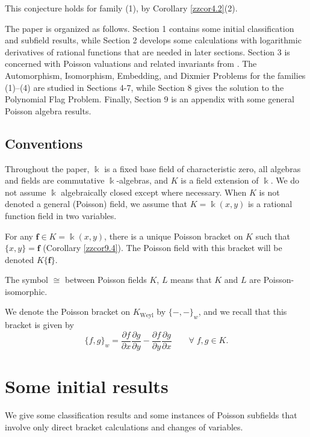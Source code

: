 \documentclass[12pt]{amsart}
\theoremstyle{plain}
\numberwithin{theorem}{section}
\numberwithin{equation}{theorem}
\theoremstyle{definition}
\newcommand \bff {{\mathbf{f}}}
\DeclareMathOperator{\Weyl}{Weyl}
\newcommand \Kweyl {K_{\Weyl}}
\begin{document}
This conjecture holds for family (1), 
by Corollary \ref{zzcor4.2}(2).
\medskip

The paper is organized as follows. 
Section 1 contains some initial 
classification and subfield results, 
while Section 2 develops some calculations 
with logarithmic derivatives of 
rational functions that are needed in 
later sections.  Section 3 is concerned 
with Poisson valuations and related 
invariants from \cite{HTWZ1, HTWZ2}.  
The Automorphism, Isomorphism, Embedding, 
and Dixmier Problems for the families 
(1)--(4) are studied in Sections 4-7, 
while Section 8 gives the solution to 
the Polynomial Flag Problem.  Finally, 
Section 9 is an appendix with 
some general Poisson algebra results.

\subsection{Conventions}
\label{zzsec0.1}
Throughout the paper, $\Bbbk$ is a fixed
base field of characteristic zero, 
all algebras and fields are commutative 
$\Bbbk$-algebras, and $K$ is a field 
extension of $\Bbbk$.  We do not 
assume $\Bbbk$ algebraically closed 
except where necessary. When $K$ is 
not denoted a general (Poisson) field, 
we assume that $K = \Bbbk(x,y)$ is a 
rational function field in two 
variables.

For any $\bff \in K= \Bbbk(x,y)$, 
there is a unique Poisson bracket on 
$K$ such that $\{x,y\} = \bff$ 
(Corollary \ref{zzcor9.4}). The Poisson 
field with this bracket will be denoted 
$K\{\bff\}$.

The symbol $\cong$ between Poisson fields 
$K$, $L$ means that $K$ and $L$ are 
Poisson-iso\-mor\-phic.

We denote the Poisson bracket on $\Kweyl$ 
by $\{-,-\}_w$, and we recall that this 
bracket is given by
$$
\{f,g\}_w = \frac{\partial f}{\partial x} \frac{\partial g}{\partial y} 
- \frac{\partial f}{\partial y} 
\frac{\partial g}{\partial x} 
\qquad \forall\; f,g \in K.
$$


\section{Some initial results}  
\label{zzsec1}

We give some classification results and 
some instances of Poisson subfields that 
involve only direct bracket calculations 
and changes of variables.

\end{document}
